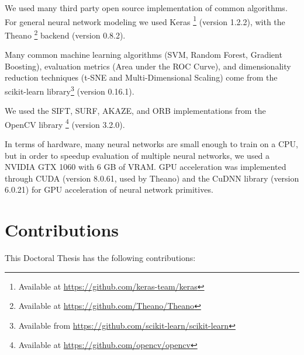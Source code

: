 We used many third party open source implementation of common algorithms. For general neural network modeling we used Keras \footnote{Available at \url{https://github.com/keras-team/keras}} (version 1.2.2), with the Theano \footnote[][1em]{Available at \url{https://github.com/Theano/Theano}} backend (version 0.8.2).

Many common machine learning algorithms (SVM, Random Forest, Gradient Boosting), evaluation metrics (Area under the ROC Curve), and dimensionality reduction techniques (t-SNE and Multi-Dimensional Scaling) come from the scikit-learn library\footnote{Available from \url{https://github.com/scikit-learn/scikit-learn}} (version 0.16.1).

We used the SIFT, SURF, AKAZE, and ORB implementations from the OpenCV library \footnote{Available at \url{https://github.com/opencv/opencv}} (version 3.2.0).

In terms of hardware, many neural networks are small enough to train on a CPU, but in order to speedup evaluation of multiple neural networks, we used a NVIDIA GTX 1060 with 6 GB of VRAM. GPU acceleration was implemented through CUDA (version 8.0.61, used by Theano) and the CuDNN library (version 6.0.21) for GPU acceleration of neural network primitives.

\section{Contributions}

This Doctoral Thesis has the following contributions:

